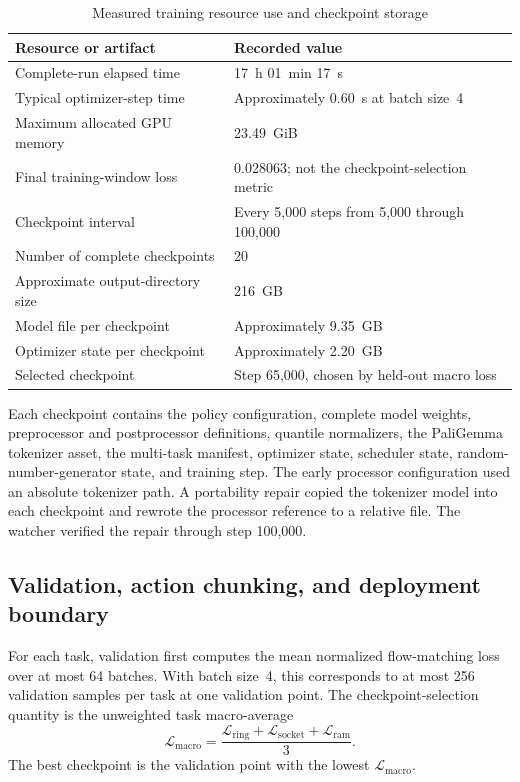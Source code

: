 \begin{table}[htbp]
  \centering
  \caption{Measured training resource use and checkpoint storage}
  \label{tab:ch4-training-resources}
  \small
  \begin{tabularx}{\textwidth}{p{}X}
    \toprule
    \textbf{Resource or artifact} & \textbf{Recorded value} \\
    \midrule
    Complete-run elapsed time & 17~h 01~min 17~s \\
    Typical optimizer-step time & Approximately 0.60~s at batch size~4 \\
    Maximum allocated GPU memory & 23.49~GiB \\
    Final training-window loss & 0.028063; not the checkpoint-selection metric \\
    Checkpoint interval & Every 5,000 steps from 5,000 through 100,000 \\
    Number of complete checkpoints & 20 \\
    Approximate output-directory size & 216~GB \\
    Model file per checkpoint & Approximately 9.35~GB \\
    Optimizer state per checkpoint & Approximately 2.20~GB \\
    Selected checkpoint & Step 65,000, chosen by held-out macro loss \\
    \bottomrule
  \end{tabularx}
\end{table}

Each checkpoint contains the policy configuration, complete model weights,
preprocessor and postprocessor definitions, quantile normalizers, the
PaliGemma tokenizer asset, the multi-task manifest, optimizer state, scheduler
state, random-number-generator state, and training step. The early processor
configuration used an absolute tokenizer path. A portability repair copied the
tokenizer model into each checkpoint and rewrote the processor reference to a
relative file. The watcher verified the repair through step 100,000.

\subsection{Validation, action chunking, and deployment boundary}

For each task, validation first computes the mean normalized flow-matching loss over at most 64 batches. With batch size~4, this corresponds to at most 256 validation samples per task at one validation point. The checkpoint-selection quantity is the unweighted task macro-average
\begin{equation}
\mathcal L_{\mathrm{macro}}
=
\frac{
\mathcal L_{\mathrm{ring}}
+
\mathcal L_{\mathrm{socket}}
+
\mathcal L_{\mathrm{ram}}
}{3}.
\label{eq:ch4-macro-flow-loss}
\end{equation}
The best checkpoint is the validation point with the lowest \(\mathcal L_{\mathrm{macro}}\).

